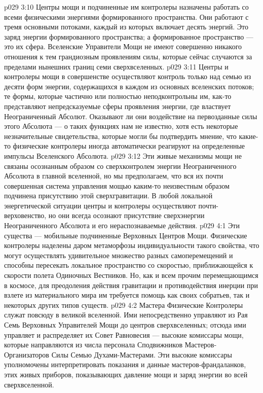 \vs p029 3:10 \pc Центры мощи и подчиненные им контролеры назначены работать со всеми физическими энергиями формированного пространства. Они работают с тремя основными потоками, каждый из которых включает десять энергий. Это заряд энергии формированного пространства; а формированное пространство --- это их сфера. Вселенские Управители Мощи не имеют совершенно никакого отношения к тем грандиозным проявлениям силы, которые сейчас случаются за пределами нынешних границ семи сверхвселенных.
\vs p029 3:11 Центры и контролеры мощи в совершенстве осуществляют контроль только над семью из десяти форм энергии, содержащихся в каждом из основных вселенских потоков; те формы, которые частично или полностью неподконтрольны им, как\hyp{}то представляют непредсказуемые сферы проявления энергии, где властвует Неограниченный Абсолют. Оказывают ли они воздействие на первозданные силы этого Абсолюта --- о таких функциях нам не известно, хотя есть некоторые незначительные свидетельства, которые могли бы подтвердить мнение, что какие\hyp{}то физические контролеры иногда автоматически реагируют на определенные импульсы Вселенского Абсолюта.
\vs p029 3:12 Эти живые механизмы мощи не связаны осознанным образом со сверхконтролем энергии Неограниченного Абсолюта в главной вселенной, но мы предполагаем, что вся их почти совершенная система управления мощью каким\hyp{}то неизвестным образом подчинена присутствию этой сверхгравитации. В любой локальной энергетической ситуации центры и контролеры осуществляют почти\hyp{}верховенство, но они всегда осознают присутствие сверхэнергии Неограниченного Абсолюта и его нераспознаваемые действия.
\vs p029 4:1 Эти существа --- мобильные подчиненные Верховных Центров Мощи. Физические контролеры наделены даром метаморфозы индивидуальности такого свойства, что могут осуществлять удивительное множество разных самоперемещений и способны пересекать локальное пространство со скоростью, приближающейся к скорости полета Одиночных Вестников. Но, как и всем прочим перемещающимся в космосе, для преодоления действия гравитации и противодействия инерции при взлете из материального мира им требуется помощь как своих собратьев, так и некоторых других типов существ.
\vs p029 4:2 Мастера Физические Контролеры служат повсюду в великой вселенной. Ими непосредственно управляют из Рая Семь Верховных Управителей Мощи до центров сверхвселенных; отсюда ими управляет и распределяет их Совет Равновесия --- высокие комиссары мощи, которые направляются из числа персонала Сподвижников Мастеров\hyp{}Организаторов Силы Семью Духами\hyp{}Мастерами. Эти высокие комиссары уполномочены интерпретировать показания и данные мастеров\hyp{}франдаланков, этих живых приборов, показывающих давление мощи и заряд энергии во всей сверхвселенной.
